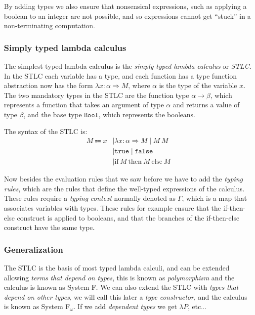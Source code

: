 \documentclass[
  a4paper, 
  10pt, 
  parskip=half, 
  DIV=20,
  toc=bibliography,
  usegeometry,
]{scrartcl}
\renewcommand{\mapsto}{\Rightarrow}
\begin{document}
By adding types we also ensure that nonsensical expressions, such as applying a
boolean to an integer are not possible, and so expressions cannot get
\enquote{stuck} in a non-terminating computation.

\subsubsection{Simply typed lambda calculus}

The simplest typed lambda calculus is the \emph{simply typed lambda calculus} or
\emph{STLC}. In the STLC each variable has a type, and each function has a type
function abstraction now has the form \(\lambda x: \alpha \mapsto M\), where
\(\alpha\) is the type of the variable \(x\). The two mandatory types in the STLC
are the function type \(\alpha \to \beta\), which represents a function that
takes an argument of type \(\alpha\) and returns a value of type \(\beta\), and
the base type \(\texttt{Bool}\), which represents the booleans.

The syntax of the STLC is:
\begin{align*}
  M \Coloneqq x & \mid \lambda x: \alpha \mapsto M \mid M \ M \\
    & \mid \texttt{true} \mid \texttt{false} \\
    & \mid \text{if} \ M \ \text{then} \ M \ \text{else} \ M
\end{align*}

Now besides the evaluation rules that we saw before we have to add the 
\emph{typing rules}, which are the rules that define the well-typed expressions 
of the calculus. These rules require a \emph{typing context} normally denoted as
\(\Gamma\), which is a map that associates variables with types. These rules
for example ensure that the if-then-else construct is applied to booleans, and
that the branches of the if-then-else construct have the same type.

\subsubsection{Generalization}

The STLC is the basis of most typed lambda calculi, and can be extended allowing
\emph{terms that depend on types}, this is known as \emph{polymorphism} and
the calculus is known as System F. We can also extend the STLC with
\emph{types that depend on other types}, we will call this later a 
\emph{type constructor}, and the calculus is known as System F\(_\omega\).
If we add \emph{dependent types} we get \(\lambda P\), etc...
\end{document}
